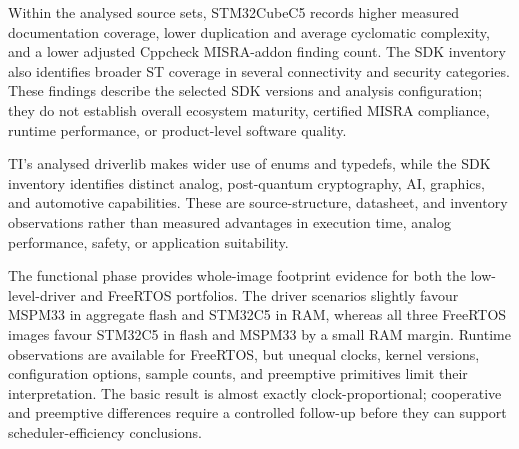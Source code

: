 Within the analysed source sets, STM32CubeC5 records higher measured documentation coverage,
lower duplication and average cyclomatic complexity, and a lower adjusted Cppcheck
MISRA-addon finding count. The SDK inventory also identifies broader ST coverage in several
connectivity and security categories. These findings describe the selected SDK versions and
analysis configuration; they do not establish overall ecosystem maturity, certified MISRA
compliance, runtime performance, or product-level software quality.

TI's analysed driverlib makes wider use of enums and typedefs, while the SDK inventory
identifies distinct analog, post-quantum cryptography, AI, graphics, and automotive
capabilities. These are source-structure, datasheet, and inventory observations rather than
measured advantages in execution time, analog performance, safety, or application
suitability.

The functional phase provides whole-image footprint evidence for both the low-level-driver and
FreeRTOS portfolios. The driver scenarios slightly favour MSPM33 in aggregate flash and STM32C5
in RAM, whereas all three FreeRTOS images favour STM32C5 in flash and MSPM33 by a small RAM
margin. Runtime observations are available for FreeRTOS, but unequal clocks, kernel versions,
configuration options, sample counts, and preemptive primitives limit their interpretation.
The basic result is almost exactly clock-proportional; cooperative and preemptive differences
require a controlled follow-up before they can support scheduler-efficiency conclusions.